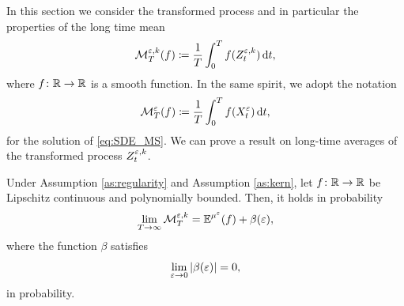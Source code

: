 \documentclass[10pt]{article}
\begin{document}
In this section we consider the transformed process and in particular the properties of the long time mean
\begin{equation}
	\mathcal M_T^{\varepsilon, k}(f) \coloneqq \frac1T \int_0^T f(Z_t^{\varepsilon,k}) \,\mathrm{d} t,
\end{equation}
where $f \colon \mathbb{R} \to \mathbb{R}$ is a smooth function. In the same spirit, we adopt the notation
\begin{equation}
	\mathcal M_T^\varepsilon(f) \coloneqq \frac1T \int_0^T f(X_t^\varepsilon) \,\mathrm{d} t,
\end{equation}
for the solution of \eqref{eq:SDE_MS}. We can prove a result on long-time averages of the transformed process $Z_t^{\varepsilon,k}$.
\begin{lemma}\label{lem:ergodic} Under Assumption \ref{as:regularity} and Assumption \ref{as:kern}, let $f\colon \mathbb{R} \to \mathbb{R}$ be Lipschitz continuous and polynomially bounded. Then, it holds in probability
	\begin{equation}
		\lim_{T\to\infty} \mathcal M_T^{\varepsilon, k} = \operatorname{\mathbb{E}}^{\mu^\varepsilon}(f) + \beta(\varepsilon),
	\end{equation}
	where the function $\beta$ satisfies
	\begin{equation}
		\lim_{\varepsilon \to 0} \left\lvert\beta(\varepsilon)\right\rvert = 0,
	\end{equation}
	in probability.
\end{lemma}
\end{document}
